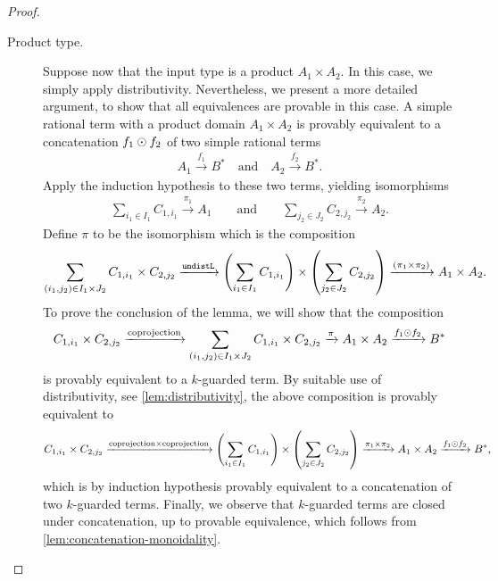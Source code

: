 \begin{proof}
\begin{description}
   \item[Product type.] Suppose now that the input type is a product $A_1 \times A_2$. In this case, we simply apply distributivity. Nevertheless, we present a more detailed argument, to show that all equivalences are provable in this case.  A simple rational term with a product domain $A_1 \times A_2$ is provably equivalent to a concatenation $f_1 \odot f_2$ of two simple rational terms 
    \begin{align*}
    A_1 \xrightarrow {f_1} B^* \quad \text{and} \quad A_2 \xrightarrow {f_2} B^*.
    \end{align*}
    Apply the induction hypothesis to these two terms, yielding isomorphisms 
    \begin{align*}
    \sum_{i_1 \in I_1} C_{1,i_1} \xrightarrow{\pi_1} A_1 \qquad \text{and} \qquad \sum_{j_2 \in J_2} C_{2,j_2} \xrightarrow{\pi_2} A_2.
    \end{align*}
    Define $\pi$ to be the isomorphism which is the composition
    \begin{align*}
    \sum_{(i_1,j_2) \in I_1 \times J_2} C_{1,i_1} \times C_{2,j_2} \xrightarrow{\mathtt{undistL}}
    \left(\sum_{i_1 \in I_1} C_{1,i_1}\right) \times \left(\sum_{j_2 \in J_2} C_{2,j_2}\right)
    \xrightarrow{
    (\pi_1 \times \pi_2)} A_1 \times A_2.
    \end{align*}
    To prove the conclusion of the lemma, we will show that  the composition 
    \begin{align*}
    C_{1,i_1} \times C_{2,j_2} 
    \xrightarrow {\text{coprojection}}
    \sum_{(i_1,j_2) \in I_1 \times J_2} C_{1,i_1} \times C_{2,j_2} 
    \xrightarrow{\pi} A_1 \times A_2 
    \xrightarrow{f_1 \odot f_2} B^*
    \end{align*}
    is provably equivalent to a $k$-guarded term. 
    By suitable use of distributivity, see \cref{lem:distributivity}, the above composition is provably equivalent to
    \begin{align*}
    C_{1,i_1} \times C_{2,j_2} 
    \xrightarrow{\text{coprojection} \times \text{coprojection}}
    \left(\sum_{i_1 \in I_1} C_{1,i_1}\right) \times \left(\sum_{j_2 \in J_2} C_{2,j_2}\right)
    \xrightarrow{\pi_1 \times \pi_2} A_1 \times A_2 
    \xrightarrow{f_1 \odot f_2}
    B^*,
    \end{align*}
    which is by induction hypothesis provably equivalent to a concatenation of two $k$-guarded terms. Finally, we observe that  $k$-guarded terms are closed under concatenation, up to provable equivalence, which follows from \cref{lem:concatenation-monoidality}.



\end{description}
\end{proof}
